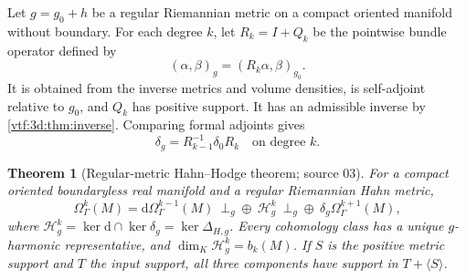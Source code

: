 \documentclass[11pt,letterpaper]{article}
\newtheorem{theorem}{Theorem}[section]
\theoremstyle{definition}
\theoremstyle{remark}
\newcommand{\dd}{\mathrm d}
\begin{document}
Let $g=g_0+h$ be a regular Riemannian metric on a compact oriented manifold
without boundary. For each degree $k$, let $R_k=I+Q_k$ be the pointwise bundle operator defined by
\[
 (\alpha,\beta)_g=(R_k\alpha,\beta)_{g_0}.
\]
It is obtained from the inverse metrics and volume densities, is self-adjoint relative to $g_0$, and $Q_k$ has positive support. It has an admissible inverse by \cref{vtf:3d:thm:inverse}. Comparing formal adjoints gives
\begin{equation}\label{vtf:3d:eq:adjointR}
 \delta_g=R_{k-1}^{-1}\delta_0R_k
 \quad\text{on degree }k.
\end{equation}

\begin{theorem}[Regular-metric Hahn--Hodge theorem; source 03]\label{vtf:3d:thm:regularhodge}
For a compact oriented boundaryless real manifold and a regular Riemannian
Hahn metric,
\[
 \Omega_\Gamma^k(M)=\dd\Omega_\Gamma^{k-1}(M)
 \ \mathbin{\perp_g\oplus}\ \mathcal H_g^k
 \ \mathbin{\perp_g\oplus}\ \delta_g\Omega_\Gamma^{k+1}(M),
\]
where $\mathcal H_g^k=\ker\dd\cap\ker\delta_g=\ker\Delta_{H,g}$.
Every cohomology class has a unique $g$-harmonic representative, and
$\dim_{K}\mathcal H_g^k=b_k(M)$. If $S$ is the positive metric support and $T$ the input support, all three components have support in $T+\langle S\rangle$.
\end{theorem}
\end{document}
